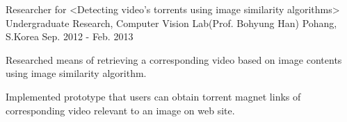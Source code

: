 \begin{cventries}
\cventry
{Researcher for <Detecting video’s torrents using image similarity algorithms>} %
{Undergraduate Research, Computer Vision Lab(Prof. Bohyung Han)} %
{Pohang, S.Korea} %
{Sep. 2012 - Feb. 2013} %
{ %
\begin{cvitems}
\item {Researched means of retrieving a corresponding video based on image contents using image similarity algorithm.}
\item {Implemented prototype that users can obtain torrent magnet links of corresponding video relevant to an image on web site.}
\end{cvitems} 
}


\end{cventries}